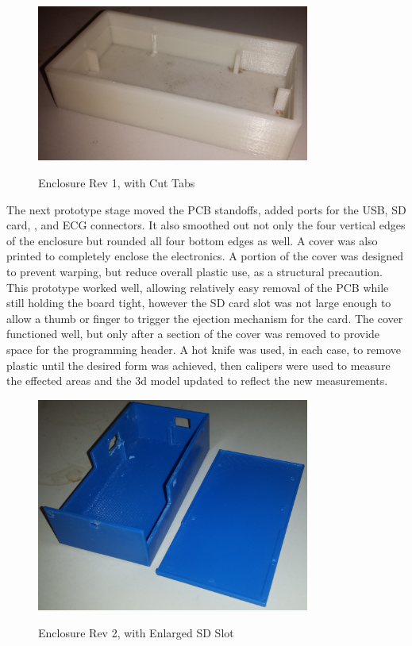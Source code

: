 \begin{figure}[ht]
 \begin{center}
  \label{fig:enclosure1}
  \includegraphics[scale=1,width=0.8\textwidth]{Images/Enclosure1.png} 
  \caption{Enclosure Rev 1, with Cut Tabs}
 
 \end{center}
\end{figure}


The next prototype stage moved the PCB standoffs, added ports for the USB, SD card, , and ECG connectors. It also smoothed out not only the four vertical edges of the enclosure but rounded all four bottom edges as well. A cover was also printed to completely enclose the electronics. A portion of the cover was designed to prevent warping, but reduce overall plastic use, as a structural precaution. This prototype worked well, allowing relatively easy removal of the PCB while still holding the board tight, however the SD card slot was not large enough to allow a thumb or finger to trigger the ejection mechanism for the card. The cover functioned well, but only after a section of the cover was removed to provide space for the programming header.  A hot knife was used, in each case, to remove plastic until the desired form was achieved, then calipers were used to measure the effected areas and the 3d model updated to reflect the new measurements.
\begin{figure}[ht]
 \begin{center}
  \label{fig:enclosure2}
  \includegraphics[scale=1,width=0.8\textwidth]{Images/Enclosure2.png} 
  \caption{Enclosure Rev 2, with Enlarged SD Slot}
 
 \end{center}
\end{figure}



